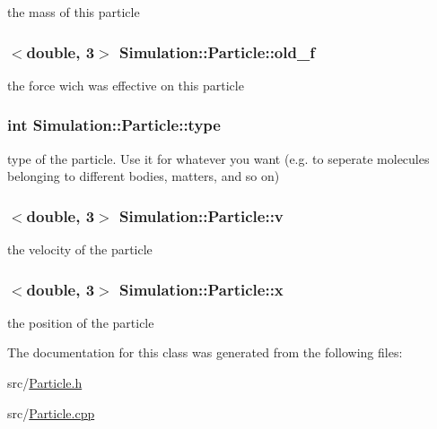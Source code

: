 the mass of this particle \hypertarget{classSimulation_1_1Particle_a80cc4684069bff79cb7d91c25237141f}{
\subsubsection[{old\-\_\-f}]{$<$double, 3$>$ Simulation\-::\-Particle\-::old\-\_\-f\hspace{0.3cm}{\ttfamily [private]}}}\label{classSimulation_1_1Particle_a80cc4684069bff79cb7d91c25237141f}
the force wich was effective on this particle \hypertarget{classSimulation_1_1Particle_aeb6388e2a21c03c7e1582eb4eeb5efb3}{
\subsubsection[{type}]{\setlength{\rightskip}{0pt plus 5cm}int Simulation\-::\-Particle\-::type\hspace{0.3cm}{\ttfamily [private]}}}\label{classSimulation_1_1Particle_aeb6388e2a21c03c7e1582eb4eeb5efb3}
type of the particle. Use it for whatever you want (e.\-g. to seperate molecules belonging to different bodies, matters, and so on) \hypertarget{classSimulation_1_1Particle_aedd9ec08978292732fc38dd6d93dc3b4}{
\subsubsection[{v}]{$<$double, 3$>$ Simulation\-::\-Particle\-::v\hspace{0.3cm}{\ttfamily [private]}}}\label{classSimulation_1_1Particle_aedd9ec08978292732fc38dd6d93dc3b4}
the velocity of the particle \hypertarget{classSimulation_1_1Particle_a37114cf327ef0591939f157489434bde}{
\subsubsection[{x}]{$<$double, 3$>$ Simulation\-::\-Particle\-::x\hspace{0.3cm}{\ttfamily [private]}}}\label{classSimulation_1_1Particle_a37114cf327ef0591939f157489434bde}
the position of the particle 

The documentation for this class was generated from the following files\-:\begin{DoxyCompactItemize}
\item 
src/\hyperlink{Particle_8h}{Particle.\-h}\item 
src/\hyperlink{Particle_8cpp}{Particle.\-cpp}\end{DoxyCompactItemize}
